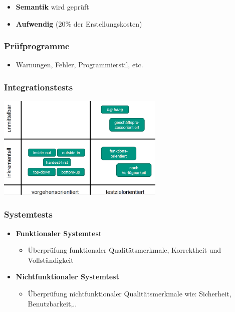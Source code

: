 \documentclass[parskip=full, 12pt]{scrartcl}
\begin{document}
				\begin{itemize}
					\item \textbf{Semantik} wird geprüft
					\item \textbf{Aufwendig} (20\% der Erstellungskosten)
				\end{itemize}
	
			\subsubsection{Prüfprogramme}
			
				\begin{itemize}
					\item Warnungen, Fehler, Programmierstil, etc.
				\end{itemize}
	
			\subsubsection{Integrationstests}
			
				\begin{center}
					\includegraphics[width=0.6\textwidth]{../images/integrationstests.png}
				\end{center}
	
			\subsubsection{Systemtests}
			
				\begin{itemize}
					\item \textbf{Funktionaler Systemtest}
					\begin{itemize}
						\item Überprüfung funktionaler Qualitätsmerkmale, Korrektheit und Vollständigkeit
					\end{itemize}
					\item \textbf{Nichtfunktionaler Systemtest}
					\begin{itemize}
						\item Überprüfung nichtfunktionaler Qualitätsmerkmale wie: Sicherheit, Benutzbarkeit,..
					\end{itemize}
				\end{itemize}
	
\end{document}
